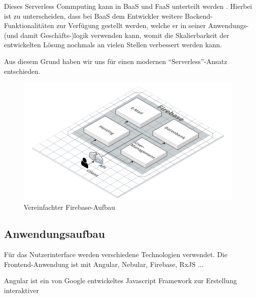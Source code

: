 Dieses Serverless Commputing kann in \ac{BaaS} und \ac{FaaS} unterteilt werden \autocite{whatIsServerless}. Hierbei ist zu unterscheiden, dass bei \ac{BaaS} dem Entwickler weitere Backend-Funktionalitäten zur Verfügung gestellt werden, welche er in seiner Anwendungs- (und damit Geschäfts-)logik verwenden kann, womit die Skalierbarkeit der entwickelten Lösung nochmals an vielen Stellen verbessert werden kann.


Aus diesem Grund haben wir uns für einen modernen \enquote{Serverless}-Ansatz entschieden.





\begin{figure}[h]
    \centering
    \includegraphics[width=.9\textwidth]{img/Firebase.png}
    \caption{Vereinfachter Firebase-Aufbau}
    \label{fig:firebaseAufbau}
\end{figure}



\subsection{Anwendungsaufbau}
Für das Nutzerinterface werden verschiedene Technologien verwendet.
Die Frontend-Anwendung ist mit Angular, Nebular, Firebase, RxJS ... %


Angular ist ein von Google entwickeltes Javascript Framework zur Erstellung interaktiver 



